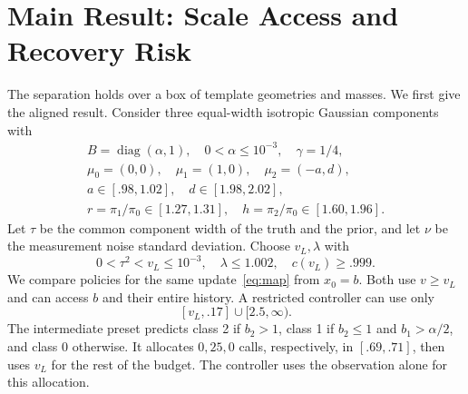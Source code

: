 \section{Main Result: Scale Access and Recovery Risk}\label{sec:extensions}
The separation holds over a box of template geometries and masses.
We first give the aligned result. Consider three equal-width
isotropic Gaussian components with
\begin{gather}
 B=\operatorname{diag}(\alpha,1),\quad 0<\alpha\le10^{-3},
 \quad\gamma=1/4,\nonumber\\
 \mu_0=(0,0),\quad \mu_1=(1,0),\quad \mu_2=(-a,d),\nonumber\\
 a\in[.98,1.02],\quad d\in[1.98,2.02],\nonumber\\
 r=\pi_1/\pi_0\in[1.27,1.31],\quad
 h=\pi_2/\pi_0\in[1.60,1.96].\label{eq:recovery_box}
\end{gather}
Let $\tau$ be the common component width of the truth and the prior,
and let $\nu$ be the measurement noise standard deviation.
Choose $v_L,\lambda$ with
\begin{equation}\label{eq:ind_coeff}
 0<\tau^2<v_L\le10^{-3},\quad
 \lambda\le1.002,\quad c(v_L)\ge.999 .
\end{equation}
We compare policies for the same update~\eqref{eq:map} from $x_0=b$.
Both use $v\ge v_L$ and can access $b$ and their entire history.
A restricted controller can use only
\begin{equation}\label{eq:main_bad}
 [v_L,.17]\cup[2.5,\infty).
\end{equation}
The intermediate preset predicts class 2 if $b_2>1$, class 1 if
$b_2\le1$ and $b_1>\alpha/2$, and class 0 otherwise. It allocates
$0,25,0$ calls, respectively, in $[.69,.71]$, then uses $v_L$ for
the rest of the budget. The controller uses the observation alone
for this allocation.

